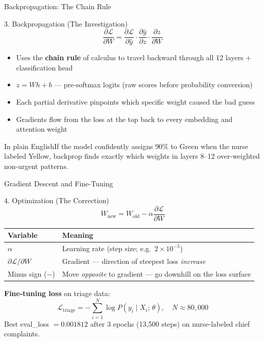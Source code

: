 \documentclass[10pt,aspectratio=169]{beamer}
\newcommand{\plain}[1]{\begin{block}{In plain English}\footnotesize #1\end{block}}
\begin{document}
\begin{frame}{Backpropagation: The Chain Rule}
	\small
	\begin{block}{3. Backpropagation (The Investigation)}
		\[
			\frac{\partial \mathcal{L}}{\partial W} = \frac{\partial \mathcal{L}}{\partial \hat{y}} \cdot \frac{\partial \hat{y}}{\partial z} \cdot \frac{\partial z}{\partial W}
		\]
	\end{block}
	\begin{itemize}
		\item Uses the \textbf{chain rule} of calculus to travel backward through all 12 layers + classification head
		\item $z = Wh + b$ --- pre-softmax logits (raw scores before probability conversion)
		\item Each partial derivative pinpoints which specific weight caused the bad guess
		\item Gradients flow from the loss at the top back to every embedding and attention weight
	\end{itemize}
	\plain{If the model confidently assigns 90\% to Green when the nurse labeled Yellow, backprop finds exactly which weights in layers 8--12 over-weighted non-urgent patterns.}
\end{frame}

\begin{frame}{Gradient Descent and Fine-Tuning}
	\small
	\begin{block}{4. Optimization (The Correction)}
		\[
			W_{\mathrm{new}} = W_{\mathrm{old}} - \alpha \frac{\partial \mathcal{L}}{\partial W}
		\]
	\end{block}
	\begin{tabular}{@{}p{2.5cm}p{8.5cm}@{}}
		\toprule
		\textbf{Variable} & \textbf{Meaning} \\
		\midrule
		$\alpha$ & Learning rate (step size; e.g.\ $2 \times 10^{-5}$) \\
		$\partial \mathcal{L}/\partial W$ & Gradient --- direction of steepest loss \textit{increase} \\
		Minus sign ($-$) & Move \textit{opposite} to gradient --- go downhill on the loss surface \\
		\bottomrule
	\end{tabular}

	\vspace{0.15cm}
	\textbf{Fine-tuning loss} on triage data:
	\[
		\mathcal{L}_{\mathrm{triage}} = -\sum_{i=1}^{N} \log P(y_i \mid X_i;\, \theta), \quad N \approx 80{,}000
	\]
	\footnotesize Best eval\_loss $= 0.001812$ after 3 epochs (13{,}500 steps) on nurse-labeled chief complaints.
\end{frame}
\end{document}
